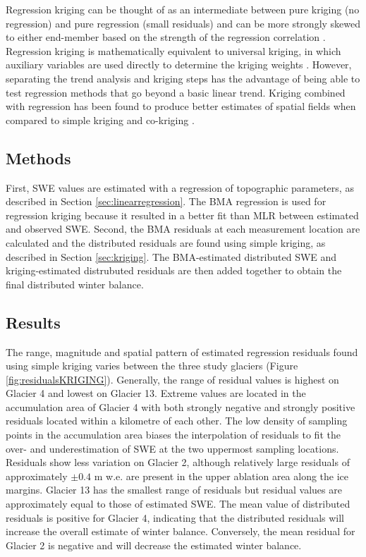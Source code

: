 \documentclass[12pt]{article}
\begin{document}
Regression kriging can be thought of as an intermediate between pure kriging (no regression) and pure regression (small residuals) and can be more strongly skewed to either end-member based on the strength of the regression correlation \citep{Hengl2007}. Regression kriging is mathematically equivalent to universal kriging, in which auxiliary variables are used directly to determine the kriging weights \citep{Hengl2007}. However, separating the trend analysis and kriging steps has the advantage of being able to test regression methods that go beyond a basic linear trend. Kriging combined with regression has been found to produce better estimates of spatial fields when compared to simple kriging and co-kriging \citep{Knotters1995}.

\subsection{Methods}

First, SWE values are estimated with a regression of topographic parameters, as described in Section \ref{sec:linearregression}. The BMA regression is used for regression kriging because it resulted in a better fit than MLR between estimated and observed SWE. Second, the BMA residuals at each measurement location are calculated and the distributed residuals are found using simple kriging, as described in Section \ref{sec:kriging}. The BMA-estimated distributed SWE and kriging-estimated distrubuted residuals are then added together to obtain the final distributed winter balance. 

\subsection{Results}

The range, magnitude and spatial pattern of estimated regression residuals found using simple kriging varies between the three study glaciers (Figure \ref{fig:residualsKRIGING}). Generally, the range of residual values is highest on Glacier 4 and lowest on Glacier 13. Extreme values are located in the accumulation area of Glacier 4 with both strongly negative and strongly positive residuals located within a kilometre of each other. The low density of sampling points in the accumulation area biases the interpolation of residuals to fit the over- and underestimation of SWE at the two uppermost sampling locations. Residuals show less variation on Glacier 2, although relatively large residuals of approximately $\pm 0.4$ m w.e. are present in the upper ablation area along the ice margins. Glacier 13 has the smallest range of residuals but residual values are approximately equal to those of estimated SWE. The mean value of distributed residuals is positive for Glacier 4, indicating that the distributed residuals will increase the overall estimate of winter balance. Conversely, the mean residual for Glacier 2 is negative and will decrease the estimated winter balance. 
\end{document}
